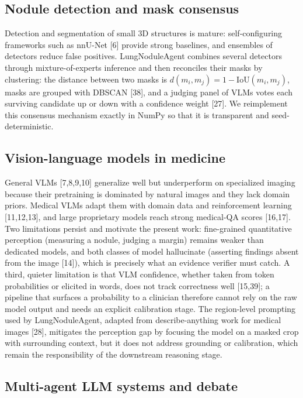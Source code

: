 \documentclass[12pt]{article}
\begin{document}
\subsection{Nodule detection and mask consensus}

Detection and segmentation of small 3D structures is mature: self-configuring frameworks such as nnU-Net [6] provide strong baselines, and ensembles of detectors reduce false positives. LungNoduleAgent combines several detectors through mixture-of-experts inference and then reconciles their masks by clustering: the distance between two masks is $d(m_i,m_j)=1-\mathrm{IoU}(m_i,m_j)$, masks are grouped with DBSCAN [38], and a judging panel of VLMs votes each surviving candidate up or down with a confidence weight [27]. We reimplement this consensus mechanism exactly in NumPy so that it is transparent and seed-deterministic.

\subsection{Vision-language models in medicine}

General VLMs [7,8,9,10] generalize well but underperform on specialized imaging because their pretraining is dominated by natural images and they lack domain priors. Medical VLMs adapt them with domain data and reinforcement learning [11,12,13], and large proprietary models reach strong medical-QA scores [16,17]. Two limitations persist and motivate the present work: fine-grained quantitative perception (measuring a nodule, judging a margin) remains weaker than dedicated models, and both classes of model hallucinate (asserting findings absent from the image [14]), which is precisely what an evidence verifier must catch. A third, quieter limitation is that VLM confidence, whether taken from token probabilities or elicited in words, does not track correctness well [15,39]; a pipeline that surfaces a probability to a clinician therefore cannot rely on the raw model output and needs an explicit calibration stage. The region-level prompting used by LungNoduleAgent, adapted from describe-anything work for medical images [28], mitigates the perception gap by focusing the model on a masked crop with surrounding context, but it does not address grounding or calibration, which remain the responsibility of the downstream reasoning stage.

\subsection{Multi-agent LLM systems and debate}
\end{document}
